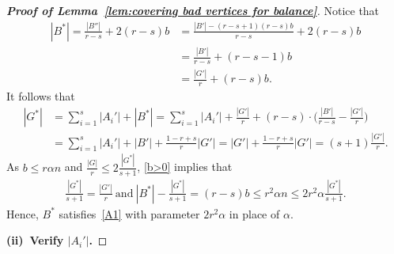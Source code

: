 \documentclass[11pt, a4paper]{article}
\theoremstyle{definition}
\newcommand{\<}{\subseteq}
\begin{document}
\begin{proof}[{\bf Proof of Lemma~\ref{lem:covering bad vertices for balance}}]
Notice that 
\begin{align*}%
|B^*|=\frac{|B''|}{r-s}+2(r-s)b
&=\frac{|B'|-(r-s+1)(r-s)b}{r-s}+2(r-s)b \nonumber\\ 
&=\frac{|B'|}{r-s}+(r-s-1)b\nonumber \\ 
&=\frac{|G'|}{r}+(r-s)b.
\end{align*}
It follows that 
\begin{align}\label{b>0}
|G^*|&=\sum_{i=1}^s|A_i'|+|B^*|=\sum_{i=1}^s|A_i'|+\frac{|G'|}{r}+(r-s)\cdot\Big(\frac{|B'|}{r-s}- \frac{|G'|}{r}\Big) \nonumber\\
&=\sum_{i=1}^s|A_i'|+|B'|+\frac{1-r+s}{r}|G'|=|G'|+\frac{1-r+s}{r}|G'|=(s+1)\frac{|G'|}{r}.
\end{align}
As $b\leq r\alpha n$ and $\frac{|G|}{r}\leq 2\frac{|G^*|}{s+1}$, \eqref{b>0} implies that 
\begin{align}\label{equal}
\frac{|G^*|}{s+1}= \frac{|G'|}{r}\ \text{and}\  |B^*|-\frac{|G^*|}{s+1}=(r-s)b\leq r^2\alpha n\leq 2r^2\alpha \frac{|G^*|}{s+1}.
\end{align}
Hence, $B^*$ satisfies~\ref{A1} {with parameter $2r^2\alpha$ in place of $\alpha$}.\medskip

\textbf{(ii)~Verify $|A_i'|$.}\medskip


\end{proof}
\end{document}
